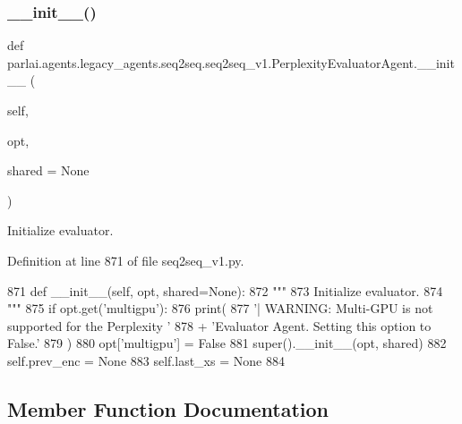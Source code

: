 \subsubsection{\texorpdfstring{\+\_\+\+\_\+init\+\_\+\+\_\+()}{\_\_init\_\_()}}
{\footnotesize\ttfamily def parlai.\+agents.\+legacy\+\_\+agents.\+seq2seq.\+seq2seq\+\_\+v1.\+Perplexity\+Evaluator\+Agent.\+\_\+\+\_\+init\+\_\+\+\_\+ (\begin{DoxyParamCaption}\item[{}]{self,  }\item[{}]{opt,  }\item[{}]{shared = {\ttfamily None} }\end{DoxyParamCaption})}

\begin{DoxyVerb}Initialize evaluator.
\end{DoxyVerb}
 

Definition at line 871 of file seq2seq\+\_\+v1.\+py.


\begin{DoxyCode}
871     \textcolor{keyword}{def }\_\_init\_\_(self, opt, shared=None):
872         \textcolor{stringliteral}{"""}
873 \textcolor{stringliteral}{        Initialize evaluator.}
874 \textcolor{stringliteral}{        """}
875         \textcolor{keywordflow}{if} opt.get(\textcolor{stringliteral}{'multigpu'}):
876             print(
877                 \textcolor{stringliteral}{'| WARNING: Multi-GPU is not supported for the Perplexity '}
878                 + \textcolor{stringliteral}{'Evaluator Agent. Setting this option to False.'}
879             )
880             opt[\textcolor{stringliteral}{'multigpu'}] = \textcolor{keyword}{False}
881         super().\_\_init\_\_(opt, shared)
882         self.prev\_enc = \textcolor{keywordtype}{None}
883         self.last\_xs = \textcolor{keywordtype}{None}
884 
\end{DoxyCode}


\subsection{Member Function Documentation}
\mbox{\label{classparlai_1_1agents_1_1legacy__agents_1_1seq2seq_1_1seq2seq__v1_1_1PerplexityEvaluatorAgent_a577da407eed3f8757efeab3522f2717b}} 
